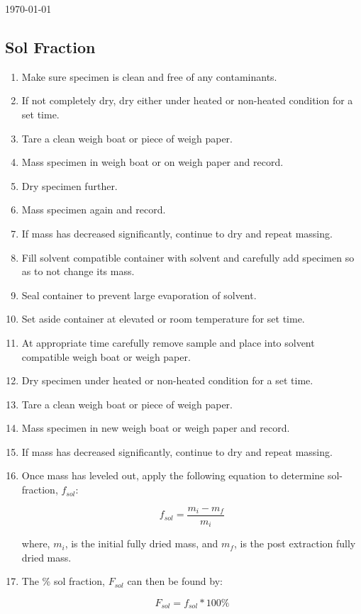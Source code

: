 \documentclass[11pt, oneside]{article}   	%
\begin{document}
\today %

\subsection{Sol Fraction} %

\begin{enumerate}

\item Make sure specimen is clean and free of any contaminants.
\item If not completely dry, dry either under heated or non-heated condition for a set time.
\item Tare a clean weigh boat or piece of weigh paper.
\item Mass specimen in weigh boat or on weigh paper and record.
\item Dry specimen further.
\item Mass specimen again and record.
\item If mass has decreased significantly, continue to dry and repeat massing.
\item Fill solvent compatible container with solvent and carefully add specimen so as to not change its mass.
\item Seal container to prevent large evaporation of solvent.
\item Set aside container at elevated or room temperature for set time.
\item At appropriate time carefully remove sample and place into solvent compatible weigh boat or weigh paper.
\item Dry specimen under heated or non-heated condition for a set time.
\item Tare a clean weigh boat or piece of weigh paper.
\item Mass specimen in new weigh boat or weigh paper and record.
\item If mass has decreased significantly, continue to dry and repeat massing.
\item Once mass has leveled out, apply the following equation to determine sol-fraction, $f_{sol}$:

    \begin{equation}
    	f_{sol} = \frac{m_{i} - m_{f}}{m_{i}}
    \end{equation}
    
    \noindent
    where, $m_{i}$, is the initial fully dried mass, and $m_{f}$, is the post extraction fully dried mass.  
    
\item The \% sol fraction, $F_{sol}$ can then be found by:

    \begin{equation}
    	F_{sol} = f_{sol}*100\%
    \end{equation}

\end{enumerate}
\end{document}
